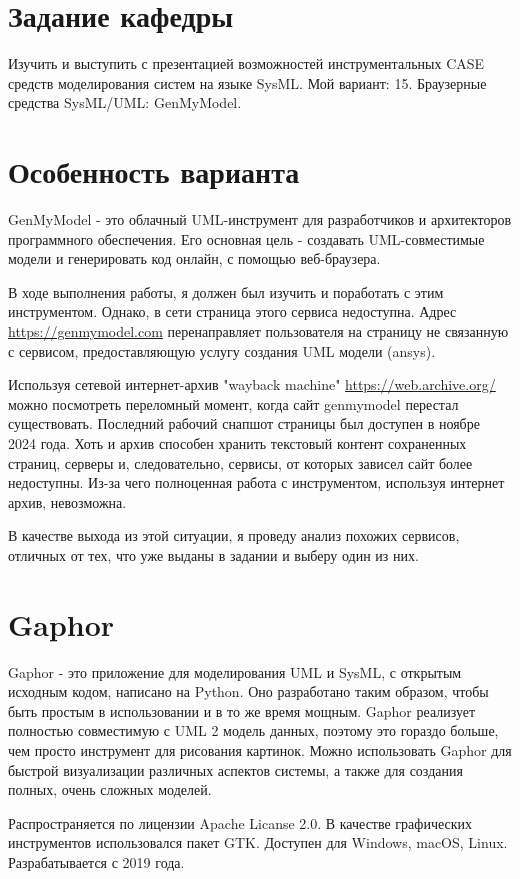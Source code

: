 \documentclass[14pt,a4paper]{extarticle}
\begin{document}
\section{Задание кафедры}
\begin{sloppypar}
    Изучить и выступить с презентацией возможностей инструментальных CASE средств моделирования систем на языке SysML.
    Мой вариант: 15. Браузерные средства SysML/UML: GenMyModel.
\end{sloppypar}

\section{Особенность варианта}

\begin{sloppypar}
GenMyModel - это облачный UML-инструмент для разработчиков и архитекторов
    программного обеспечения. Его основная цель - создавать UML-совместимые
    модели и генерировать код онлайн, с помощью веб-браузера.

    В ходе выполнения работы, я должен был изучить и поработать с этим инструментом.
    Однако, в сети страница этого сервиса недоступна. Адрес \url{https://genmymodel.com} перенаправляет пользователя
    на страницу не связанную с сервисом, предоставляющую услугу создания UML модели (ansys).

    Используя сетевой интернет-архив "wayback machine" \url{https://web.archive.org/} можно посмотреть переломный момент,
    когда сайт genmymodel перестал существовать. Последний рабочий снапшот страницы был доступен в ноябре 2024 года.
    Хоть и архив способен хранить текстовый контент сохраненных страниц, серверы и, следовательно, сервисы, от которых зависел
    сайт более недоступны. Из-за чего полноценная работа с инструментом, используя интернет архив, невозможна.

    В качестве выхода из этой ситуации, я проведу анализ похожих сервисов, отличных от тех, что уже выданы в задании и
    выберу один из них.

\end{sloppypar}
    \section{Gaphor}
\begin{sloppypar}
    Gaphor - это приложение для моделирования UML и SysML, с открытым исходным
    кодом, написано на Python. Оно разработано таким образом, чтобы быть
    простым в использовании и в то же время мощным. Gaphor реализует полностью
    совместимую с UML 2 модель данных, поэтому это гораздо больше, чем просто
    инструмент для рисования картинок. Можно использовать Gaphor для быстрой
    визуализации различных аспектов системы, а также для создания полных, очень
    сложных моделей.

    Распространяется по лицензии Apache Licanse 2.0.
    В качестве графических инструментов использовался пакет GTK.
    Доступен для Windows, macOS, Linux.
    Разрабатывается с 2019 года.

\end{sloppypar}
\end{document}
